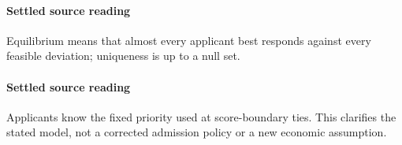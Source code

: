 \documentclass[10pt]{article}
\begin{document}
\begin{ReviewVerbatim}
{\begin{restatable}[Equilibrium under group differences]{proposition}{propEquiEnv}
[Next verbatim source excerpt]

	Denote the group-specific rank threshold for group $\G$ as
	\begin{equation*}
	\thresG{c} := f^{-1}\left(\frac{f_\mix(c)}{\psi_\G}\right).
	\end{equation*}
\end{ReviewVerbatim}

\paragraph{Settled source reading}
\begin{sloppypar}
Equilibrium means that almost every applicant best responds against every feasible deviation;\allowbreak{} uniqueness is up to a null set.\allowbreak{}
\end{sloppypar}
\paragraph{Settled source reading}
\begin{sloppypar}
Applicants know the fixed priority used at score-\allowbreak{}boundary ties.\allowbreak{} This clarifies the stated model, not a corrected admission policy or a new economic assumption.\allowbreak{}
\end{sloppypar}
\end{document}
